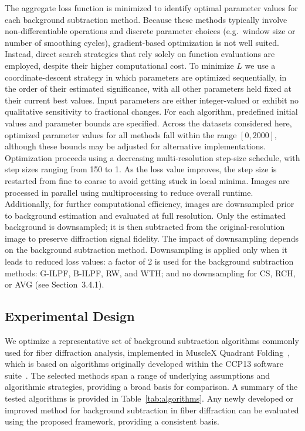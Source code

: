 \documentclass[iucr]{iucrjournals}
\begin{document}
The aggregate loss function is minimized to identify optimal parameter values for each background subtraction method. Because these methods typically involve non-differentiable operations and discrete parameter choices (e.g.\ window size or number of smoothing cycles), gradient-based optimization is not well suited. Instead, direct search strategies that rely solely on function evaluations are employed, despite their higher computational cost. To minimize $L$ we use a coordinate-descent strategy in which parameters are optimized sequentially, in the order of their estimated significance, with all other parameters held fixed at their current best values. Input parameters are either integer-valued or exhibit no qualitative sensitivity to fractional changes. For each algorithm, predefined initial values and parameter bounds are specified. Across the datasets considered here, optimized parameter values for all methods fall within the range $[0, 2000]$, although these bounds may be adjusted for alternative implementations. Optimization proceeds using a decreasing multi-resolution step-size schedule, with step sizes ranging from 150 to 1. As the loss value improves, the step size is restarted from fine to coarse to avoid getting stuck in local minima. Images are processed in parallel using multiprocessing to reduce overall runtime. Additionally, for further computational efficiency, images are downsampled prior to background estimation and evaluated at full resolution. Only the estimated background is downsampled; it is then subtracted from the original-resolution image to preserve diffraction signal fidelity. The impact of downsampling depends on the background subtraction method. Downsampling is applied only when it leads to reduced loss values: a factor of 2 is used for the background subtraction methods: G-ILPF, B-ILPF, RW, and WTH; and no downsampling for CS, RCH, or AVG (see Section~3.4.1).



\subsection{Experimental Design}


We optimize a representative set of background subtraction algorithms commonly used for fiber diffraction analysis, implemented in MuscleX Quadrant Folding~\cite{JiratrakanvongEtAl2024}, which is based on algorithms originally developed within the CCP13 software suite~\cite{HeEtAl2007}. The selected methods span a range of underlying assumptions and algorithmic strategies, providing a broad basis for comparison. A summary of the tested algorithms is provided in Table~\ref{tab:algorithms}. Any newly developed or improved method for background subtraction in fiber diffraction can be evaluated using the proposed framework, providing a consistent basis.
\end{document}

